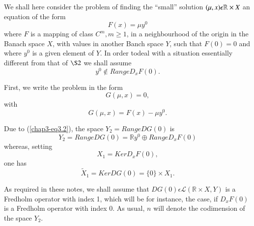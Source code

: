 We shall here consider the problem of finding the ``small'' solution
$(\mu,\break x) \epsilon \mathbb{R} \times X$ an equation of the form 
\begin{equation*}
F(x) = \mu y^{0}\tag{3.1}\label{chap3-eq3.1}
\end{equation*}
where $F$ is a mapping of class $C^{m}, m \geq 1$, in a neighbourhood of
the origin in the Banach space $X$, with values in another Banch space $Y$,
such that $F(0) = 0$ and where $y^{0}$ is a given element of $Y$. In
order to\pageoriginale deal with a situation essentially different
from that of $\S 2$ we shall assume
\begin{equation*}
y^{0} \notin Range D_{x}F(0).\tag{3.2}\label{chap3-eq3.2}
\end{equation*}

First, we write the problem in the form
$$
G(\mu, x) = 0,
$$
with
\begin{equation*}
G(\mu, x) = F(x) - \mu y^{0}.\tag{3.3}\label{chap3-eq3.3}
\end{equation*}

Due to (\ref{chap3-eq3.2}), the space $Y_{2} = Range DG(0)$ is
\begin{equation*}
Y_{2} = Range DG(0) = \mathbb{R} y^{0} \oplus Range D_{x}F(0)\tag{3.4}\label{chap3-eq3.4}
\end{equation*}
whereas, setting
\begin{equation*}
X_{1} = Ker D_{x}F(0),
\end{equation*}
one has
\begin{equation*}
\widetilde{X}_{1} = Ker DG(0) = \{0\} \times X_{1}.\tag{3.6}\label{chap3-eq3.6}
\end{equation*}

As required in these notes, we shall assume that $DG(0) \epsilon
\mathscr{L} (\mathbb{R} \times X, Y)$ is a Fredholm operator with
index 1, which will be for instance, the case, if $D_{x}F(0)$ is a
Fredholm operator with index 0. As usual, $n$ will denote the codimension
of the space $Y_{2}$.

